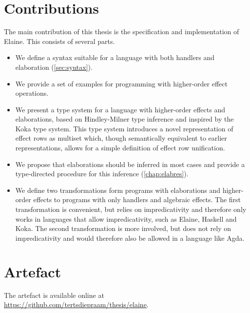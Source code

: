 \section{Contributions}

The main contribution of this thesis is the specification and implementation of Elaine. This consists of several parts.

\begin{itemize}
    \item We define a syntax suitable for a language with both handlers and elaboration (\cref{sec:syntax}).
    \item We provide a set of examples for programming with higher-order effect operations.
    \item We present a type system for a language with higher-order effects and elaborations, based on Hindley-Milner type inference and inspired by the Koka type system. This type system introduces a novel representation of effect rows as multiset which, though semantically equivalent to earlier representations, allows for a simple definition of effect row unification.
    \item We propose that elaborations should be inferred in most cases and provide a type-directed procedure for this inference (\cref{chap:elabres}).
    \item We define two transformations form programs with elaborations and higher-order effects to programs with only handlers and algebraic effects. The first transformation is convenient, but relies on impredicativity and therefore only works in languages that allow impredicativity, such as Elaine, Haskell and Koka. The second transformation is more involved, but does not rely on impredicativity and would therefore also be allowed in a language like Agda.
\end{itemize}

\section{Artefact}


The artefact is available online at \url{https://github.com/tertsdiepraam/thesis/elaine}.

